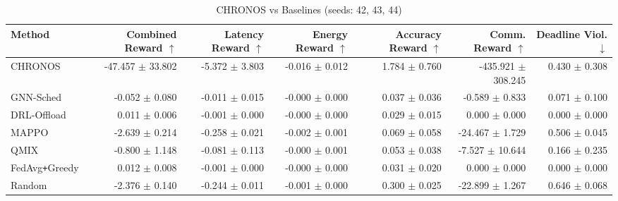 \begin{table}[t]
\centering
\caption{CHRONOS vs Baselines (seeds: 42, 43, 44)}
\label{tab:comparison}
\begin{tabular}{lrrrrrr}
\toprule
Method & Combined Reward $\uparrow$ & Latency Reward $\uparrow$ & Energy Reward $\uparrow$ & Accuracy Reward $\uparrow$ & Comm. Reward $\uparrow$ & Deadline Viol. $\downarrow$ \\
\midrule
\midrule
CHRONOS & -47.457 $\pm$ 33.802 & -5.372 $\pm$ 3.803 & -0.016 $\pm$ 0.012 & 1.784 $\pm$ 0.760 & -435.921 $\pm$ 308.245 & 0.430 $\pm$ 0.308 \\
\midrule
GNN-Sched & -0.052 $\pm$ 0.080 & -0.011 $\pm$ 0.015 & -0.000 $\pm$ 0.000 & 0.037 $\pm$ 0.036 & -0.589 $\pm$ 0.833 & 0.071 $\pm$ 0.100 \\
DRL-Offload & 0.011 $\pm$ 0.006 & -0.001 $\pm$ 0.000 & -0.000 $\pm$ 0.000 & 0.029 $\pm$ 0.015 & 0.000 $\pm$ 0.000 & 0.000 $\pm$ 0.000 \\
MAPPO & -2.639 $\pm$ 0.214 & -0.258 $\pm$ 0.021 & -0.002 $\pm$ 0.001 & 0.069 $\pm$ 0.058 & -24.467 $\pm$ 1.729 & 0.506 $\pm$ 0.045 \\
QMIX & -0.800 $\pm$ 1.148 & -0.081 $\pm$ 0.113 & -0.000 $\pm$ 0.001 & 0.053 $\pm$ 0.038 & -7.527 $\pm$ 10.644 & 0.166 $\pm$ 0.235 \\
FedAvg\texttt{+}Greedy & 0.012 $\pm$ 0.008 & -0.001 $\pm$ 0.000 & -0.000 $\pm$ 0.000 & 0.031 $\pm$ 0.020 & 0.000 $\pm$ 0.000 & 0.000 $\pm$ 0.000 \\
Random & -2.376 $\pm$ 0.140 & -0.244 $\pm$ 0.011 & -0.001 $\pm$ 0.000 & 0.300 $\pm$ 0.025 & -22.899 $\pm$ 1.267 & 0.646 $\pm$ 0.068 \\
\bottomrule
\end{tabular}
\end{table}